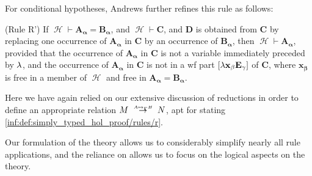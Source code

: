 \begin{comments}
  For conditional hypotheses, Andrews further refines this rule as follows:
  \begin{displayquote}
    (Rule R') If \( \mscrH \vdash \mathbf{A_\alpha} = \mathbf{B_\alpha} \), and \( \mscrH \vdash \mathbf{C} \), and \( \mathbf{D} \) is obtained from \( \mathbf{C} \) by replacing one occurrence of \( \mathbf{A_\alpha} \) in \( \mathbf{C} \) by an occurrence of \( \mathbf{B_\alpha} \), then \( \mscrH \vdash \mathbf{A_\alpha} \), provided that the occurrence of \( \mathbf{A_\alpha} \) in \( \mathbf{C} \) is not a variable immediately preceded by \( \mathbf{{\mathrm \lambda}} \), and the occurrence of \( \mathbf{A_\alpha} \) in \( \mathbf{C} \) is not in a wf part \( [\mathbf{{\mathrm \lambda} x_\beta E_\gamma}] \) of \( \mathbf{C} \), where \( \mathbf{x_\beta} \) is free in a member of \( \mscrH \) and free in \( \mathbf{A_\alpha} = \mathbf{B_\alpha} \).
  \end{displayquote}

  Here we have again relied on our extensive discussion of reductions in order to define an appropriate relation \( M \redrel{A \mapsto_\Gamma B} N \), apt for stating \ref{inf:def:simply_typed_hol_proof/rules/r}.

  Our formulation of the theory allows us to considerably simplify nearly all rule applications, and the reliance on  allows us to focus on the logical aspects on the theory.
\end{comments}

